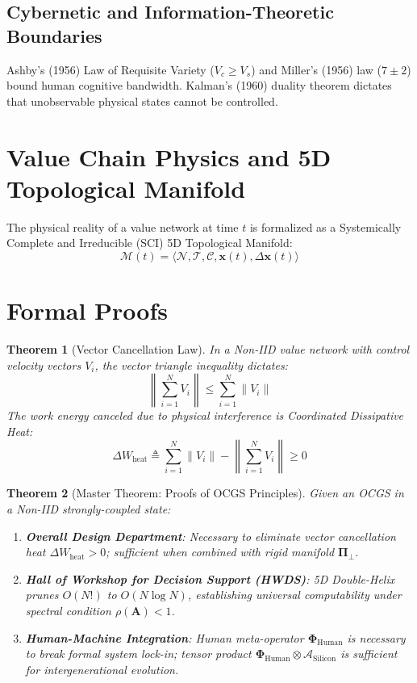 \documentclass[11pt,a4paper]{article}
\newtheorem{theorem}{Theorem}
\begin{document}
\subsection{Cybernetic and Information-Theoretic Boundaries}
Ashby's (1956) Law of Requisite Variety ($V_c \ge V_s$) and Miller's (1956) law ($7 \pm 2$) bound human cognitive bandwidth. Kalman's (1960) duality theorem dictates that unobservable physical states cannot be controlled.

\section{Value Chain Physics and 5D Topological Manifold}
The physical reality of a value network at time $t$ is formalized as a Systemically Complete and Irreducible (SCI) 5D Topological Manifold:
\begin{equation}
\mathcal{M}(t) = \langle \mathcal{N}, \mathcal{T}, \mathcal{C}, \mathbf{x}(t), \Delta\mathbf{x}(t) \rangle
\end{equation}

\section{Formal Proofs}
\begin{theorem}[Vector Cancellation Law]
In a Non-IID value network with control velocity vectors $V_i$, the vector triangle inequality dictates:
\begin{equation}
\left\|\sum_{i=1}^{N} V_i\right\| \le \sum_{i=1}^{N} \|V_i\|
\end{equation}
The work energy canceled due to physical interference is Coordinated Dissipative Heat:
\begin{equation}
\Delta W_{\text{heat}} \triangleq \sum_{i=1}^{N} \|V_i\| - \left\|\sum_{i=1}^{N} V_i\right\| \ge 0
\end{equation}
\end{theorem}

\begin{theorem}[Master Theorem: Proofs of OCGS Principles]
Given an OCGS in a Non-IID strongly-coupled state:
\begin{enumerate}
    \item \textbf{Overall Design Department}: Necessary to eliminate vector cancellation heat $\Delta W_{\text{heat}} > 0$; sufficient when combined with rigid manifold $\mathbf{\Pi}_\bot$.
    \item \textbf{Hall of Workshop for Decision Support (HWDS)}: 5D Double-Helix prunes $O(N!)$ to $O(N \log N)$, establishing universal computability under spectral condition $\rho(\mathbf{A}) < 1$.
    \item \textbf{Human-Machine Integration}: Human meta-operator $\mathbf{\Phi}_{\mathrm{Human}}$ is necessary to break formal system lock-in; tensor product $\mathbf{\Phi}_{\mathrm{Human}} \otimes \mathcal{A}_{\mathrm{Silicon}}$ is sufficient for intergenerational evolution.
\end{enumerate}
\end{theorem}
\end{document}
